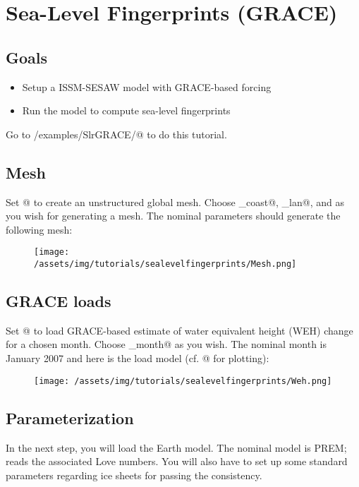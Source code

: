\section{Sea-Level Fingerprints (GRACE)}
\subsection{Goals} %
\begin{itemize}
	\item Setup a ISSM-SESAW model with GRACE-based forcing
	\item Run the model to compute sea-level fingerprints
\end{itemize}

Go to \verb@trunk/examples/SlrGRACE/@ to do this tutorial.

\subsection{Mesh} %
Set @ to create an unstructured global mesh. Choose \verb@mindistance_coast@,
\verb@mindistance_lan@, and \verb@maxdistance@ as you wish for generating a mesh. The nominal
parameters should generate the following mesh:
\begin{figure}[H]
	\begin{center}
		\texttt{[image: /assets/img/tutorials/sealevelfingerprints/Mesh.png]}
	\end{center}
\end{figure}
\subsection{GRACE loads} %
Set @ to load GRACE-based estimate of water equivalent height (WEH) change for a chosen
month. Choose \verb@year_month@ as you wish. The nominal month is January 2007 and here is the load
model (cf. @ for plotting):
\begin{figure}[H]
	\begin{center}
		\texttt{[image: /assets/img/tutorials/sealevelfingerprints/Weh.png]}
	\end{center}
\end{figure}
\subsection{Parameterization} %
In the next step, you will load the Earth model. The nominal model is PREM; \verb@lovenumbers@ reads
the associated Love numbers. You will also have to set up some standard parameters regarding ice
sheets for passing the consistency.
